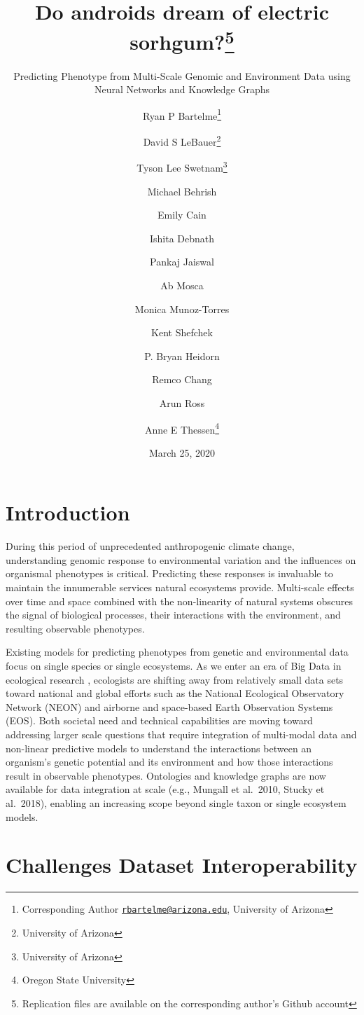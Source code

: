 \documentclass[12pt,]{article}
\title{Do androids dream of electric sorhgum?\thanks{Replication files are available on the corresponding author's Github
account}}
\subtitle{Predicting Phenotype from Multi-Scale Genomic and Environment Data using
Neural Networks and Knowledge Graphs}
\author{Ryan P Bartelme\footnote{Corresponding Author
  \href{mailto:rbartelme@arizona.edu}{\nolinkurl{rbartelme@arizona.edu}},
  University of Arizona} \and David S LeBauer\footnote{University of Arizona} \and Tyson Lee Swetnam\footnote{University of Arizona} \and Michael Behrish \and Emily Cain \and Ishita Debnath \and Pankaj Jaiswal \and Ab Mosca \and Monica Munoz-Torres \and Kent Shefchek \and P. Bryan Heidorn \and Remco Chang \and Arun Ross \and Anne E Thessen\footnote{Oregon State University}}
\date{March 25, 2020}
\begin{document}
\maketitle

\hypertarget{introduction}{%
\section{Introduction}\label{introduction}}

During this period of unprecedented anthropogenic climate change,
understanding genomic response to environmental variation and the
influences on organismal phenotypes is critical. Predicting these
responses is invaluable to maintain the innumerable services natural
ecosystems provide. Multi-scale effects over time and space combined
with the non-linearity of natural systems
\citep{lorenz1963deterministic, ruel1999jensen, west2009general}
obscures the signal of biological processes, their interactions with the
environment, and resulting observable phenotypes.

Existing models for predicting phenotypes from genetic and environmental
data focus on single species or single ecosystems. As we enter an era of
Big Data in ecological research \citep{balch2020neon}, ecologists are
shifting away from relatively small data sets toward national and global
efforts such as the National Ecological Observatory Network (NEON)
\citep{keller2008continental} and airborne and space-based Earth
Observation Systems (EOS). Both societal need and technical capabilities
are moving toward addressing larger scale questions that require
integration of multi-modal data and non-linear predictive models to
understand the interactions between an organism's genetic potential and
its environment and how those interactions result in observable
phenotypes. Ontologies and knowledge graphs are now available for data
integration at scale (e.g., Mungall et al.~2010, Stucky et al.~2018),
enabling an increasing scope beyond single taxon or single ecosystem
models.

\hypertarget{challenges-dataset-interoperability}{%
\section{Challenges Dataset
Interoperability}\label{challenges-dataset-interoperability}}
\end{document}
